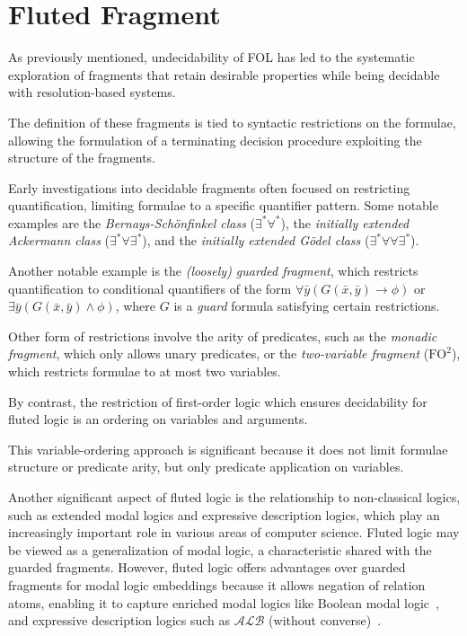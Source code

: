 \chapter{Fluted Fragment}\label{chap:fluted-fragment}

As previously mentioned, undecidability of FOL has led to the systematic exploration of fragments that retain desirable properties while being decidable with resolution-based systems.

The definition of these fragments is tied to syntactic restrictions on the formulae, allowing the formulation of a terminating decision procedure exploiting the structure of the fragments.

Early investigations into decidable fragments often focused on restricting quantification, limiting formulae to a specific quantifier pattern.
Some notable examples are the \emph{Bernays-Schönfinkel class} (\(\exists^*\forall^*\)), the \emph{initially extended Ackermann class} (\(\exists^*\forall\exists^*\)), and the \emph{initially extended Gödel class} (\(\exists^*\forall\forall\exists^*\)).

Another notable example is the \emph{(loosely) guarded fragment}, which restricts quantification to conditional quantifiers of the form \(\forall \bar{y} (G(\bar{x},\bar{y}) \rightarrow \phi)\) or \(\exists \bar{y} (G(\bar{x},\bar{y}) \land \phi)\), where \(G\) is a \emph{guard} formula satisfying certain restrictions.

Other form of restrictions involve the arity of predicates, such as the \emph{monadic fragment}, which only allows unary predicates, or the \emph{two-variable fragment} (\(\text{FO}^2\)), which restricts formulae to at most two variables.

By contrast, the restriction of first-order logic which ensures decidability for fluted logic is an ordering on variables and arguments.

This variable-ordering approach is significant because it does not limit formulae structure or predicate arity, but only predicate application on variables.

Another significant aspect of fluted logic is the relationship to non-classical logics, such as extended modal logics and expressive description logics, which play an increasingly important role in various areas of computer science.
Fluted logic may be viewed as a generalization of modal logic, a characteristic shared with the guarded fragments. 
However, fluted logic offers advantages over guarded fragments for modal logic embeddings because it allows negation of relation atoms, enabling it to capture enriched modal logics like Boolean modal logic~\cite{gargov1990boolean}, and expressive description logics such as \(\mathcal{ALB}\) (without converse)~\cite{hustadt2000issues}.

